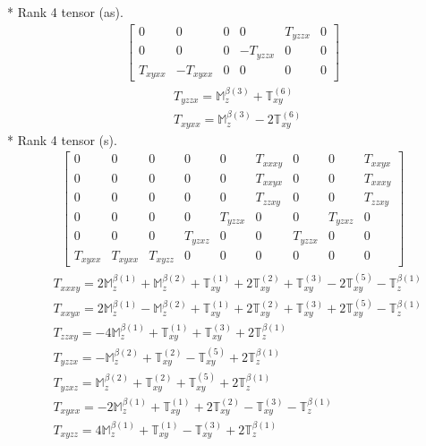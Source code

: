 \documentclass[fleqn,8pt,landscape]{jsarticle}
\begin{document}
* Rank 4 tensor (as).
\begin{align*}
\begin{bmatrix} 0 & 0 & 0 & 0 & T_{yzzx} & 0 \\ 0 & 0 & 0 & - T_{yzzx} & 0 & 0 \\ T_{xyxx} & - T_{xyxx} & 0 & 0 & 0 & 0 \end{bmatrix}
\end{align*}
\begin{align*}
& T_{yzzx} = \mathbb{M}_{z}^{\beta(3)} + \mathbb{T}_{xy}^{(6)} \\
& T_{xyxx} = \mathbb{M}_{z}^{\beta(3)} - 2 \mathbb{T}_{xy}^{(6)}
\end{align*}
* Rank 4 tensor (s).
\begin{align*}
\begin{bmatrix} 0 & 0 & 0 & 0 & 0 & T_{xxxy} & 0 & 0 & T_{xxyx} \\ 0 & 0 & 0 & 0 & 0 & T_{xxyx} & 0 & 0 & T_{xxxy} \\ 0 & 0 & 0 & 0 & 0 & T_{zzxy} & 0 & 0 & T_{zzxy} \\ 0 & 0 & 0 & 0 & T_{yzzx} & 0 & 0 & T_{yzxz} & 0 \\ 0 & 0 & 0 & T_{yzxz} & 0 & 0 & T_{yzzx} & 0 & 0 \\ T_{xyxx} & T_{xyxx} & T_{xyzz} & 0 & 0 & 0 & 0 & 0 & 0 \end{bmatrix}
\end{align*}
\begin{align*}
& T_{xxxy} = 2 \mathbb{M}_{z}^{\beta(1)} + \mathbb{M}_{z}^{\beta(2)} + \mathbb{T}_{xy}^{(1)} + 2 \mathbb{T}_{xy}^{(2)} + \mathbb{T}_{xy}^{(3)} - 2 \mathbb{T}_{xy}^{(5)} - \mathbb{T}_{z}^{\beta(1)} \\
& T_{xxyx} = 2 \mathbb{M}_{z}^{\beta(1)} - \mathbb{M}_{z}^{\beta(2)} + \mathbb{T}_{xy}^{(1)} + 2 \mathbb{T}_{xy}^{(2)} + \mathbb{T}_{xy}^{(3)} + 2 \mathbb{T}_{xy}^{(5)} - \mathbb{T}_{z}^{\beta(1)} \\
& T_{zzxy} = - 4 \mathbb{M}_{z}^{\beta(1)} + \mathbb{T}_{xy}^{(1)} + \mathbb{T}_{xy}^{(3)} + 2 \mathbb{T}_{z}^{\beta(1)} \\
& T_{yzzx} = - \mathbb{M}_{z}^{\beta(2)} + \mathbb{T}_{xy}^{(2)} - \mathbb{T}_{xy}^{(5)} + 2 \mathbb{T}_{z}^{\beta(1)} \\
& T_{yzxz} = \mathbb{M}_{z}^{\beta(2)} + \mathbb{T}_{xy}^{(2)} + \mathbb{T}_{xy}^{(5)} + 2 \mathbb{T}_{z}^{\beta(1)} \\
& T_{xyxx} = - 2 \mathbb{M}_{z}^{\beta(1)} + \mathbb{T}_{xy}^{(1)} + 2 \mathbb{T}_{xy}^{(2)} - \mathbb{T}_{xy}^{(3)} - \mathbb{T}_{z}^{\beta(1)} \\
& T_{xyzz} = 4 \mathbb{M}_{z}^{\beta(1)} + \mathbb{T}_{xy}^{(1)} - \mathbb{T}_{xy}^{(3)} + 2 \mathbb{T}_{z}^{\beta(1)}
\end{align*}
\end{document}
